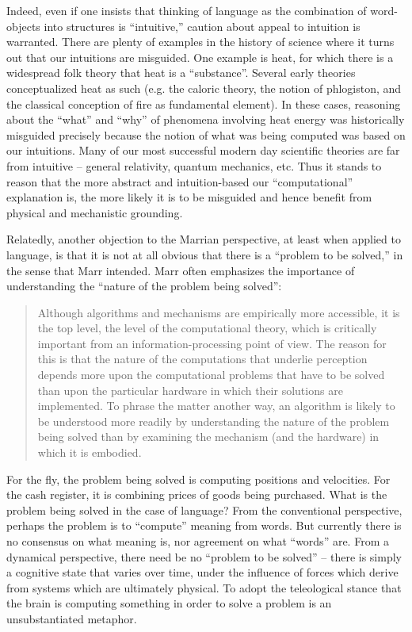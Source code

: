 Indeed, even if one insists that thinking of language as the combination of word-objects into structures is “intuitive,” caution about appeal to intuition is warranted. There are plenty of examples in the history of science where it turns out that our intuitions are misguided. One example is heat, for which there is a widespread folk theory that heat is a “substance”. Several early theories conceptualized heat as such (e.g. the caloric theory, the notion of phlogiston, and the classical conception of fire as fundamental element). In these cases, reasoning about the “what” and “why” of phenomena involving heat energy was historically misguided precisely because the notion of what was being computed was based on our intuitions. Many of our most successful modern day scientific theories are far from intuitive -- general relativity, quantum mechanics, etc. Thus it stands to reason that the more abstract and intuition-based our “computational” explanation is, the more likely it is to be misguided and hence benefit from physical and mechanistic grounding.

  Relatedly, another objection to the Marrian perspective, at least when applied to language, is that it is not at all obvious that there is a “problem to be solved,” in the sense that Marr intended. Marr often emphasizes the importance of understanding the “nature of the problem being solved”:

\begin{quote}
Although algorithms and mechanisms are empirically more accessible, it is the top level, the level of the computational theory, which is critically important from an information-processing point of view. The reason for this is that the nature of the computations that underlie perception depends more upon the computational problems that have to be solved than upon the particular hardware in which their solutions are implemented. To phrase the matter another way, an algorithm is likely to be understood more readily by understanding the nature of the problem being solved than by examining the mechanism (and the hardware) in which it is embodied. \citep[27]{Marr1982}
\end{quote}

  For the fly, the problem being solved is computing positions and velocities. For the cash register, it is combining prices of goods being purchased. What is the problem being solved in the case of language? From the conventional perspective, perhaps the problem is to “compute” meaning from words. But currently there is no consensus on what meaning is, nor agreement on what “words” are. From a dynamical perspective, there need be no “problem to be solved” -- there is simply a cognitive state that varies over time, under the influence of forces which derive from systems which are ultimately physical. To adopt the teleological stance that the brain is computing something in order to solve a problem is an unsubstantiated metaphor.

